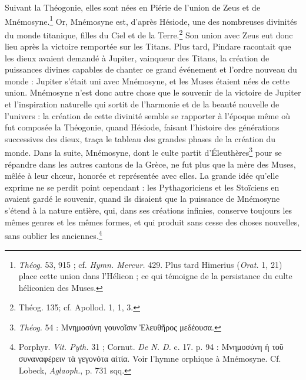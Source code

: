\documentclass[landscape, a4paper, 11pt, oneside, polutonikogreek, french]{article}
\begin{document}
Suivant la Théogonie, elles sont nées en Piérie de l'union de Zeus et de Mnémosyne.\footnote{\emph{Théog.} 53, 915 ; cf. \emph{Hymn. Mercur.} 429. Plus tard Himerius (\emph{Orat.} 1, 21) place cette union dans l'Hélicon ; ce qui témoigne de la persistance du culte héliconien des Muses.} Or, Mnémosyne est, d'après Hésiode, une des nombreuses divinités du monde titanique, filles du Ciel et de la Terre.\footnote{Théog. 135; cf. Apollod. 1, 1, 3.} Son union avec Zeus eut donc lieu après la victoire remportée sur les Titans. Plus tard, Pindare racontait que les dieux avaient demandé à Jupiter, vainqueur des Titans, la création de puissances divines capables de chanter ce grand événement et l'ordre nouveau du monde : Jupiter s'était uni avec Mnémosyne, et les Muses étaient nées de cette union. Mnémosyne n'est donc autre chose que le souvenir de la victoire de Jupiter et l'inspiration naturelle qui sortit de l'harmonie et de la beauté nouvelle de l'univers : la création de cette divinité semble se rapporter à l'époque même où fut composée la Théogonie, quand Hésiode, faisant l'histoire des générations successives des dieux, traça le tableau des grandes phases de la création du monde. Dans la suite, Mnémosyne, dont le culte partit d'Éleuthères\footnote{\emph{Théog.} 54 : Μνημοσύνη γουνοῖσιν Ἐλευθῆρος μεδέουσα.} pour se répandre dans les autres cantons de la Grèce, ne fut plus que la mère des Muses, mêlée à leur chœur, honorée et représentée avec elles. La grande idée qu'elle exprime ne se perdit point cependant : les Pythagoriciens et les Stoïciens en avaient gardé le souvenir, quand ils disaient que la puissance de Mnémosyne s'étend à la nature entière, qui, dans ses créations infinies, conserve toujours les mêmes genres et les mêmes formes, et qui produit sans cesse des choses nouvelles, sans oublier les anciennes.\footnote{Porphyr. \emph{Vit. Pyth.} 31 ; Cornut. \emph{De N. D.} c. 17. p. 94 : Μνημοσύνη ἠ τοῦ συναναφέρειν τὰ γεγονότα αἰτία. Voir l'hymne orphique à Mnémosyne. Cf. Lobeck, \emph{Aglaoph.}, p. 731 sqq.}
\end{document}
